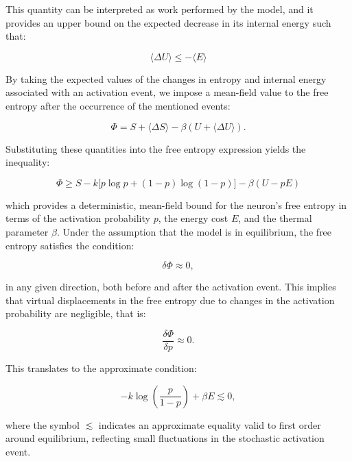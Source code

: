 \documentclass[12pt]{article}
\begin{document}
This quantity can be interpreted as work performed by the model, and it provides an upper bound on the expected decrease in its internal energy such that:

\begin{equation}
\langle \Delta U \rangle \le -\langle E \rangle
\end{equation}

By taking the expected values of the changes in entropy and internal energy associated with an activation event, we impose a mean-field value to the free entropy after the occurrence of the mentioned events:

\begin{equation}
\Phi = S + \langle \Delta S \rangle - \beta (U + \langle \Delta U\rangle).
\end{equation}

Substituting these quantities into the free entropy expression yields the inequality:

\begin{equation}
\Phi \ge S - k \big[ p \log p + (1-p) \log(1-p) \big] - \beta (U - p E)
\end{equation}

which provides a deterministic, mean-field bound for the neuron’s free entropy in terms of the activation probability $p$, the energy cost $E$, and the thermal parameter $\beta$. Under the assumption that the model is in equilibrium, the free entropy satisfies the condition:

\begin{equation}
\delta \Phi \approx 0,
\end{equation}

in any given direction, both before and after the activation event. This implies that virtual displacements in the free entropy due to changes in the activation probability are negligible, that is:

\begin{equation}
\frac{\delta \Phi}{\delta p} \approx 0.
\end{equation}

This translates to the approximate condition:

\begin{equation}
- k \log \left( \frac{p}{1-p} \right) + \beta E \lesssim 0,
\end{equation}

where the symbol $\lesssim$ indicates an approximate equality valid to first order around equilibrium, reflecting small fluctuations in the stochastic activation event.
\end{document}
